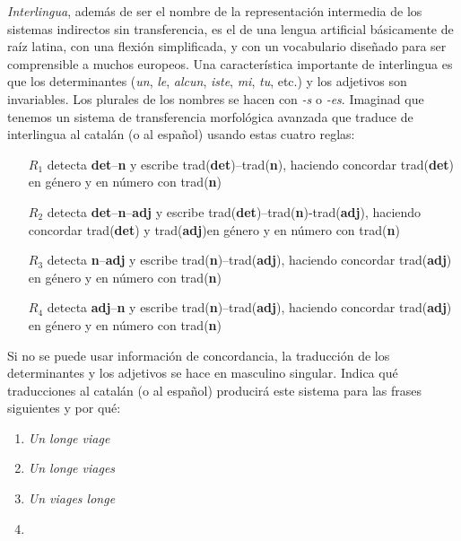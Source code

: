 
\item \emph{Interlingua}, además de ser el nombre de la representación intermedia de los sistemas indirectos sin transferencia, es el de una lengua artificial básicamente de raíz latina, con una flexión simplificada, y con un vocabulario diseñado para ser comprensible a muchos europeos. Una característica importante de interlingua es que los determinantes (\emph{un}, \emph{le}, \emph{alcun}, \emph{iste}, \emph{mi}, \emph{tu}, etc.) y los adjetivos son invariables. Los plurales de los nombres se hacen con  \emph{-s} o \emph{-es}. Imaginad que tenemos un sistema de transferencia morfológica avanzada que traduce de interlingua al catalán (o al español) usando estas cuatro reglas: \begin{itemize} \item[$R_1$] detecta \textbf{det}--\textbf{n} y escribe \textsf{trad}(\textbf{det})--\textsf{trad}(\textbf{n}), haciendo concordar \textsf{trad}(\textbf{det}) en género y en número con \textsf{trad}(\textbf{n}) \item[$R_2$] detecta \textbf{det}--\textbf{n}--\textbf{adj} y escribe \textsf{trad}(\textbf{det})--\textsf{trad}(\textbf{n})-\textsf{trad}(\textbf{adj}), haciendo concordar \textsf{trad}(\textbf{det}) y \textsf{trad}(\textbf{adj})en género y en número con \textsf{trad}(\textbf{n}) \item[$R_3$] detecta \textbf{n}--\textbf{adj} y escribe \textsf{trad}(\textbf{n})--\textsf{trad}(\textbf{adj}), haciendo concordar \textsf{trad}(\textbf{adj}) en género y en número con \textsf{trad}(\textbf{n}) \item[$R_4$] detecta \textbf{adj}--\textbf{n} y escribe \textsf{trad}(\textbf{n})--\textsf{trad}(\textbf{adj}), haciendo concordar \textsf{trad}(\textbf{adj}) en género y en número con \textsf{trad}(\textbf{n}) \end{itemize} Si no se puede usar información de concordancia, la traducción de los determinantes y los adjetivos se hace en masculino singular. Indica qué traducciones al catalán (o al español) producirá este sistema para las frases siguientes y por qué: \begin{enumerate} \item \emph{Un longe viage} \item \emph{Un longe viages} \item \emph{Un viages longe} \item 
\end{enumerate}
